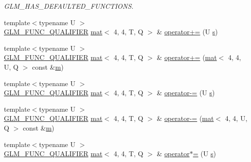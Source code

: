 \begin{DoxyCompactItemize}
\begin{DoxyCompactList}\small\item\em G\+L\+M\+\_\+\+H\+A\+S\+\_\+\+D\+E\+F\+A\+U\+L\+T\+E\+D\+\_\+\+F\+U\+N\+C\+T\+I\+O\+NS. \end{DoxyCompactList}\item 
{\footnotesize template$<$typename U $>$ }\\\mbox{\hyperlink{setup_8hpp_a33fdea6f91c5f834105f7415e2a64407}{G\+L\+M\+\_\+\+F\+U\+N\+C\+\_\+\+Q\+U\+A\+L\+I\+F\+I\+ER}} \mbox{\hyperlink{structglm_1_1mat}{mat}}$<$ 4, 4, T, Q $>$ \& \mbox{\hyperlink{structglm_1_1mat_3_014_00_014_00_01_t_00_01_q_01_4_a78e8853303a6899f72b463c9075c4599}{operator+=}} (U \mbox{\hyperlink{_s_d_l__opengl_8h_a4af680a6c683f88ed67b76f207f2e6e4}{s}})
\item 
{\footnotesize template$<$typename U $>$ }\\\mbox{\hyperlink{setup_8hpp_a33fdea6f91c5f834105f7415e2a64407}{G\+L\+M\+\_\+\+F\+U\+N\+C\+\_\+\+Q\+U\+A\+L\+I\+F\+I\+ER}} \mbox{\hyperlink{structglm_1_1mat}{mat}}$<$ 4, 4, T, Q $>$ \& \mbox{\hyperlink{structglm_1_1mat_3_014_00_014_00_01_t_00_01_q_01_4_a408fc5e603bd8cabac8c493c57533821}{operator+=}} (\mbox{\hyperlink{structglm_1_1mat}{mat}}$<$ 4, 4, U, Q $>$ const \&\mbox{\hyperlink{_s_d_l__opengl__glext_8h_af593500c283bf1a787a6f947f503a5c2}{m}})
\item 
{\footnotesize template$<$typename U $>$ }\\\mbox{\hyperlink{setup_8hpp_a33fdea6f91c5f834105f7415e2a64407}{G\+L\+M\+\_\+\+F\+U\+N\+C\+\_\+\+Q\+U\+A\+L\+I\+F\+I\+ER}} \mbox{\hyperlink{structglm_1_1mat}{mat}}$<$ 4, 4, T, Q $>$ \& \mbox{\hyperlink{structglm_1_1mat_3_014_00_014_00_01_t_00_01_q_01_4_aecbd6fe73f2df0690098bbfadc48863d}{operator-\/=}} (U \mbox{\hyperlink{_s_d_l__opengl_8h_a4af680a6c683f88ed67b76f207f2e6e4}{s}})
\item 
{\footnotesize template$<$typename U $>$ }\\\mbox{\hyperlink{setup_8hpp_a33fdea6f91c5f834105f7415e2a64407}{G\+L\+M\+\_\+\+F\+U\+N\+C\+\_\+\+Q\+U\+A\+L\+I\+F\+I\+ER}} \mbox{\hyperlink{structglm_1_1mat}{mat}}$<$ 4, 4, T, Q $>$ \& \mbox{\hyperlink{structglm_1_1mat_3_014_00_014_00_01_t_00_01_q_01_4_aefa852deacee364e0a9526f829ddf85a}{operator-\/=}} (\mbox{\hyperlink{structglm_1_1mat}{mat}}$<$ 4, 4, U, Q $>$ const \&\mbox{\hyperlink{_s_d_l__opengl__glext_8h_af593500c283bf1a787a6f947f503a5c2}{m}})
\item 
{\footnotesize template$<$typename U $>$ }\\\mbox{\hyperlink{setup_8hpp_a33fdea6f91c5f834105f7415e2a64407}{G\+L\+M\+\_\+\+F\+U\+N\+C\+\_\+\+Q\+U\+A\+L\+I\+F\+I\+ER}} \mbox{\hyperlink{structglm_1_1mat}{mat}}$<$ 4, 4, T, Q $>$ \& \mbox{\hyperlink{structglm_1_1mat_3_014_00_014_00_01_t_00_01_q_01_4_a9bf5d9e348d7f5ebc4945e96afe9e2f1}{operator$\ast$=}} (U \mbox{\hyperlink{_s_d_l__opengl_8h_a4af680a6c683f88ed67b76f207f2e6e4}{s}})

\end{DoxyCompactItemize}
